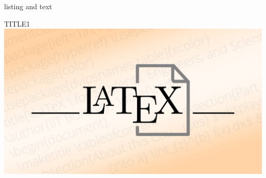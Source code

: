 \documentclass[]{myHOWTO-V001}
\begin{document}
\begin{myTEXEXdoclst}{}{listing and text}
\setlength{\parskip}{3mm}

\lipsum[4]

\qquad
\begin{myFIGlst}{TITLE1}{}
	\includegraphics[scale=0.15]{LaTeX.jpg}
\end{myFIGlst}

\lipsum[2]
\end{myTEXEXdoclst}
\end{document}
